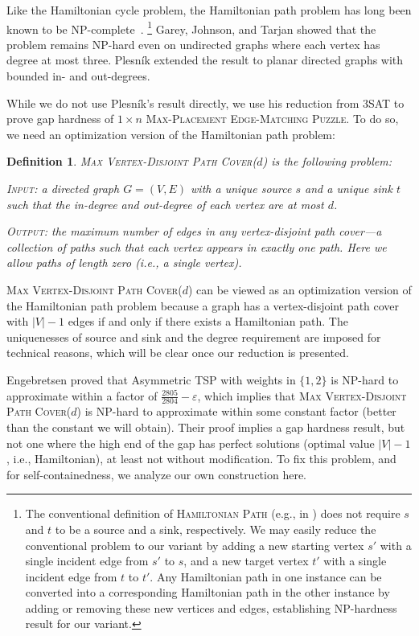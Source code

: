 \documentclass[11pt]{article}
\newtheorem{definition}{Definition}
\begin{document}
Like the Hamiltonian cycle problem, the Hamiltonian path problem has long been known to be NP-complete~\cite{GJ79}.%
%
\footnote{The conventional definition of \textsc{Hamiltonian Path} (e.g., in \cite{GJ79}) does not require $s$ and $t$ to be a source and a sink, respectively. We may easily reduce the conventional problem to our variant by adding a new starting vertex $s'$ with a single incident edge from $s'$ to $s$, and a new target vertex $t'$ with a single incident edge from $t$ to $t'$. Any Hamiltonian path in one instance can be converted into a corresponding Hamiltonian path in the other instance by adding or removing these new vertices and edges, establishing NP-hardness result for our variant.}
%
Garey, Johnson, and Tarjan \cite{GJT76} showed that the problem remains NP-hard even on undirected graphs where each vertex has degree at most three.
Plesn{\'i}k \cite{plesnik} extended the result to planar directed graphs with bounded in- and out-degrees.

While we do not use Plesn{\'i}k's result directly, we use his reduction from 3SAT to prove gap hardness of \textsc{$1 \times n$ Max-Placement Edge-Matching Puzzle}. To do so, we need an optimization version of the Hamiltonian path problem:

\begin{definition}
	\textsc{Max Vertex-Disjoint Path Cover($d$)} is the following problem:

	\textsc{Input:} a directed graph $G = (V, E)$ with a unique source $s$ and a unique sink $t$ such that the in-degree and out-degree of each vertex are at most $d$.

	\textsc{Output:} the maximum number of edges in any vertex-disjoint path cover---a collection of paths such that each vertex appears in exactly one path. Here we allow paths of length zero (i.e., a single vertex).
\end{definition}

\textsc{Max Vertex-Disjoint Path Cover($d$)} can be viewed as an optimization version of the Hamiltonian path problem because a graph has a vertex-disjoint path cover with $|V| - 1$ edges if and only if there exists a Hamiltonian path. The uniquenesses of source and sink and the degree requirement are imposed for technical reasons, which will be clear once our reduction is presented. 

Engebretsen \cite{Enge03} proved that Asymmetric TSP with weights in $\{1,2\}$
is NP-hard to approximate within a factor of $\frac{2805}{2804}-\varepsilon$,
which implies
\cite{Vishwanathan-1992} that \textsc{Max Vertex-Disjoint Path Cover($d$)}
is NP-hard to approximate within some constant factor (better than the
constant we will obtain).  Their proof implies a gap hardness result,
but not one where the high end of the gap has perfect solutions
(optimal value $|V|-1$, i.e., Hamiltonian), at least not without modification.
To fix this problem, and for self-containedness, we analyze our own
construction here.
\end{document}
